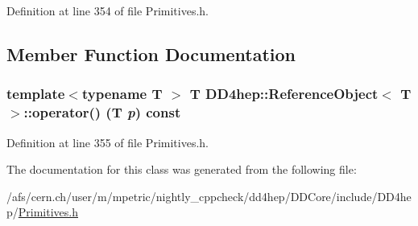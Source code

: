 Definition at line 354 of file Primitives.h.

\subsection{Member Function Documentation}
\hypertarget{class_d_d4hep_1_1_reference_object_a45b2c18d77ae70b4e23d7e24db3aefb5}{
\subsubsection[{operator()}]{\setlength{\rightskip}{0pt plus 5cm}template$<$typename T $>$ {\bf T} {\bf DD4hep::ReferenceObject}$<$ {\bf T} $>$::operator() ({\bf T} {\em p}) const}}
\label{class_d_d4hep_1_1_reference_object_a45b2c18d77ae70b4e23d7e24db3aefb5}


Definition at line 355 of file Primitives.h.

The documentation for this class was generated from the following file:\begin{DoxyCompactItemize}
\item 
/afs/cern.ch/user/m/mpetric/nightly\_\-cppcheck/dd4hep/DDCore/include/DD4hep/\hyperlink{_primitives_8h}{Primitives.h}\end{DoxyCompactItemize}

